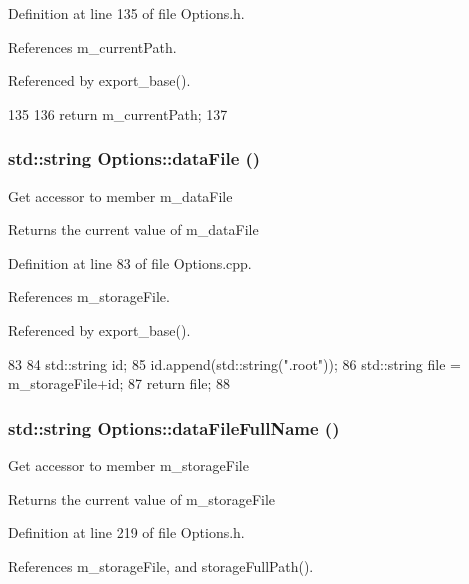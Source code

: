 Definition at line 135 of file Options.h.

References m\_\-currentPath.

Referenced by export\_\-base().


\begin{DoxyCode}
135                                  {
136                 return m_currentPath;
137         }
\end{DoxyCode}
\hypertarget{classOptions_a166984c16a957bf2e8e0f0a1ce39eb73}{
\subsubsection[{dataFile}]{\setlength{\rightskip}{0pt plus 5cm}std::string Options::dataFile ()}}
\label{classOptions_a166984c16a957bf2e8e0f0a1ce39eb73}
Get accessor to member m\_\-dataFile \begin{DoxyReturn}{Returns}
the current value of m\_\-dataFile 
\end{DoxyReturn}


Definition at line 83 of file Options.cpp.

References m\_\-storageFile.

Referenced by export\_\-base().


\begin{DoxyCode}
83                              {
84   std::string id;
85   id.append(std::string(".root"));
86   std::string file = m_storageFile+id;
87   return file;
88 }
\end{DoxyCode}
\hypertarget{classOptions_ab1cd9f237e9c18fd72323c74565453f8}{
\subsubsection[{dataFileFullName}]{\setlength{\rightskip}{0pt plus 5cm}std::string Options::dataFileFullName ()}}
\label{classOptions_ab1cd9f237e9c18fd72323c74565453f8}
Get accessor to member m\_\-storageFile \begin{DoxyReturn}{Returns}
the current value of m\_\-storageFile 
\end{DoxyReturn}


Definition at line 219 of file Options.h.

References m\_\-storageFile, and storageFullPath().

